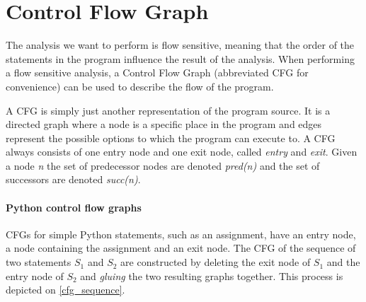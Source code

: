 \section{Control Flow Graph}\label{control_flow_graph}
The analysis we want to perform is flow sensitive, meaning that the order of the statements in the program influence the result of the analysis.
When performing a flow sensitive analysis, a Control Flow Graph (abbreviated CFG for convenience) can be used to describe the flow of the program.

A CFG is simply just another representation of the program source.
It is a directed graph where a node is a specific place in the program and edges represent the possible options to which the program can execute to.
A CFG always consists of one entry node and one exit node, called \textit{entry} and \textit{exit}.
Given a node \textit{n} the set of predecessor nodes are denoted \textit{pred(n)} and the set of successors are denoted \textit{succ(n)}.

\paragraph{Python control flow graphs}
CFGs for simple Python statements, such as an assignment, have an entry node, a node containing the assignment and an exit node.
The CFG of the sequence of two statements $S_1$ and $S_2$ are constructed by deleting the exit node of $S_1$ and the entry node of $S_2$ and \emph{gluing} the two resulting graphs together.
This process is depicted on \cref{cfg_sequence}.

